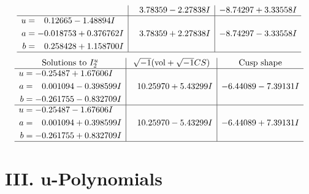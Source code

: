\documentclass[1p]{elsarticle_modified}
\theoremstyle{definition}
\newcommand{\I}{\sqrt{-1}}
\begin{document}
$$\begin{array}{c|c|c}
 & \phantom{-}3.78359 - 2.27838 I & -8.74297 + 3.33558 I \\ \hline\begin{aligned}
u &= \phantom{-}0.12665 - 1.48894 I \\
a &= -0.018753 + 0.376762 I \\
b &= \phantom{-}0.258428 + 1.158700 I\end{aligned}
 & \phantom{-}3.78359 + 2.27838 I & -8.74297 - 3.33558 I\\
 \hline 
 \end{array}$$\newpage$$\begin{array}{c|c|c}  
\text{Solutions to }I^u_{2}& \I (\text{vol} + \sqrt{-1}CS) & \text{Cusp shape}\\
 \hline 
\begin{aligned}
u &= -0.25487 + 1.67606 I \\
a &= \phantom{-}0.001094 - 0.398599 I \\
b &= -0.261755 - 0.832709 I\end{aligned}
 & \phantom{-}10.25970 + 5.43299 I & -6.44089 - 7.39131 I \\ \hline\begin{aligned}
u &= -0.25487 - 1.67606 I \\
a &= \phantom{-}0.001094 + 0.398599 I \\
b &= -0.261755 + 0.832709 I\end{aligned}
 & \phantom{-}10.25970 - 5.43299 I & -6.44089 + 7.39131 I\\
 \hline 
 \end{array}$$\newpage
\newpage\renewcommand{\arraystretch}{1}
\centering \section*{ III. u-Polynomials}
\end{document}
